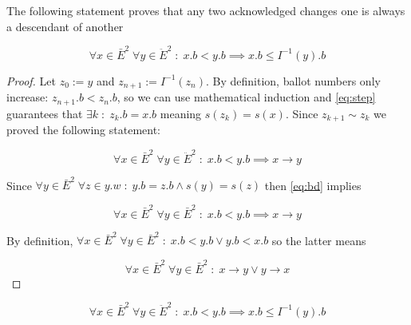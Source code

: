 \documentclass[a4paper,USenglish]{lipics-v2018}
\theoremstyle{definition}
\begin{document}
\begin{appendices}
        \begin{lemma}
            The following statement proves that any two acknowledged changes one is always a descendant of another
          
            \begin{equation} \label{eq:step}
                \forall x \in \bar{E}^2 \; \forall y \in \ddot{E}^2 \;:\; x.b < y.b \implies x.b \leq I^{-1}(y).b
            \end{equation}
        \end{lemma}
        
        \begin{proof}
            Let $z_0 := y$ and $z_{n+1} := I^{-1}(z_{n})$. By definition, ballot numbers only increase: $z_{n+1}.b < z_{n}.b$, so we can use mathematical induction and \ref{eq:step} guarantees that $\exists k \;:\; z_k.b = x.b$ meaning $s(z_k) = s(x)$. Since $z_{k+1} \sim z_k$ we proved the following statement:
        
            \begin{equation} \label{eq:bd}
                \forall x \in \bar{E}^2 \; \forall y \in \ddot{E}^2 \;:\; x.b < y.b \implies x \to y
            \end{equation}
            
            Since $\forall y \in \bar{E}^2 \; \forall z \in y.w \;:\; y.b=z.b \land s(y)=s(z)$ then \ref{eq:bd} implies
            
            \begin{equation}
                \forall x \in \bar{E}^2 \; \forall y \in \bar{E}^2 \;:\; x.b < y.b \implies x \to y
            \end{equation}
            
            By definition, $\forall x \in \bar{E}^2 \; \forall y \in \bar{E}^2 \;:\; x.b < y.b \lor y.b < x.b$ so the latter means
            
            \begin{equation}
                \forall x \in \bar{E}^2 \; \forall y \in \bar{E}^2 \;:\; x \to y \lor y \to x
            \end{equation}
        \end{proof}
        
        \begin{theorem} \label{th:proof2}
            $$\forall x \in \bar{E}^2 \; \forall y \in \ddot{E}^2 \;:\; x.b < y.b \implies x.b \leq I^{-1}(y).b$$
        \end{theorem}
        

\end{appendices}
\end{document}
